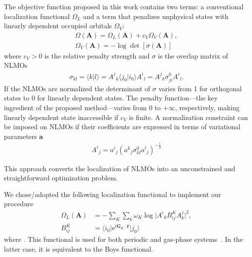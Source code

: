 \documentclass[aps,prl,reprint,amsmath,amssymb]{revtex4-1}
\newcommand*{\imi}{i} %
\newcommand*{\E}{\mathrm{e}}
\newcommand{\ket}[1]{\ensuremath{\vert #1 \rangle}}
\newcommand{\bra}[1]{\ensuremath{\langle #1 \vert}}
\newcommand{\braket}[2]{\ensuremath{\langle #1 \vert #2 \rangle}} %
\newcommand{\op}[1]{\ensuremath{\hat{#1}}} %
\begin{document}
The objective function proposed in this work contains two terms: a conventional localization functional $\Omega_L$ and a term that penalizes unphysical states with linearly dependent occupied orbitals $\Omega_V$:
%
\begin{equation} \label{eq:fun-pen}
\begin{split}
\Omega(\mathbf{A}) = \Omega_L(\mathbf{A}) + c_V \Omega_V(\mathbf{A}), \\
\Omega_V(\mathbf{A}) = - \log \det \left[ \sigma (\mathbf{A}) \right]
\end{split}
\end{equation}
%
where $c_V > 0$ is the relative penalty strength and $\sigma$ is the overlap matrix of NLMOs 
%
\begin{equation}
\begin{split}
\sigma_{kl} = \braket{k}{l} = {A^j}_k \braket{j_0}{i_0}{A^i}_l = {A^j}_k \sigma_{ji}^0{A^i}_l .
\end{split}
\end{equation}
%
%
If the NLMOs are normalized the determinant of $\sigma$ varies from 1 for orthogonal states to 0 for linearly dependent states. The penalty function---the key ingredient of the proposed method---varies from 0 to $+\infty$, respectively, making linearly dependent state inaccessible if $c_V$ is finite. A normalization constraint can be imposed on NLMOs if their coefficients are expressed in terms of variational parameters $\mathbf{a}$
%
\begin{equation}
\begin{split}
{A^i}_j = {a^i}_{j} ({a^k}_{j} \sigma^0_{kl}{a^l}_{j})^{-\frac{1}{2}}
\end{split}
\end{equation}

This approach converts the localization of NLMOs into an unconstrained and straightforward optimization problem. 

We chose/adopted the following localization functional to implement our procedure 
%
\begin{equation} \label{eq:fun-loc}
\begin{split}
\Omega_L(\mathbf{A}) &= - \sum_K \sum_k \omega_K \log \vert {A^i}_k B^K_{ij} A^j_k \vert^2, \\
B^K_{ij} &= \bra{i_0} \E^{\imi \mathbf{G}_K \cdot \mathbf{\op{r}}} \ket{j_0}
\end{split}
\end{equation}
%
where . This functional is used for both periodic and gas-phase systems~\cite{berghold2000general}. In the latter case, it is equivalent to the Boys functional.
\end{document}
